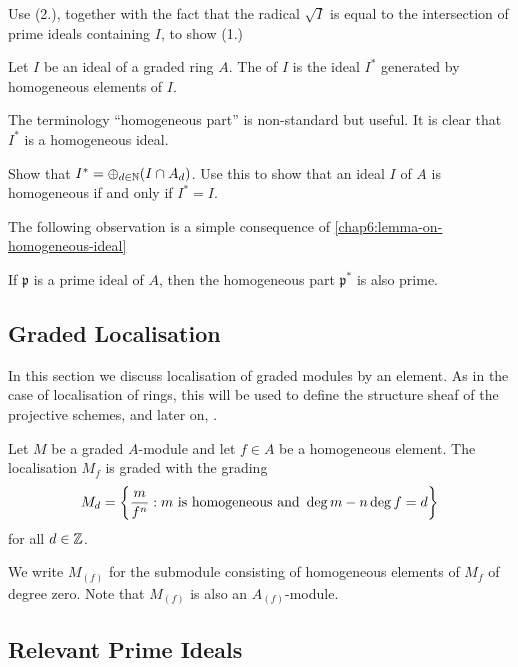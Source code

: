 \begin{exercise}
	Use (2.), together with the fact that the radical $\sqrt{I}$ is equal to the intersection of prime ideals containing $I$, to show (1.)
\end{exercise}

\begin{definition}
	Let $I$ be an ideal of a graded ring $A$. The  of $I$ is the ideal $I^\ast$ generated by homogeneous elements of $I$.
\end{definition}

The terminology ``homogeneous part'' is non-standard but useful. It is clear that $I^\ast$ is a homogeneous ideal.

\begin{exercise}
	Show that $I^\ast = \oplus_{d \in \NN} (I \cap A_d)$. Use this to show that an ideal $I$ of $A$ is homogeneous if and only if $I^\ast = I$.
\end{exercise}

The following observation is a simple consequence of \cref{chap6:lemma-on-homogeneous-ideal}
\begin{proposition}
If $\mathfrak{p}$ is a prime ideal of $A$, then the homogeneous part $\mathfrak{p}^\ast$ is also prime.
\end{proposition}


\subsection*{Graded Localisation}

In this section we discuss localisation of graded modules by an element. As in the case of localisation of rings, this will be used to define the structure sheaf of the projective schemes, and later on, .

\begin{lemma}
	Let $M$ be a graded $A$-module and let $f \in A$ be a homogeneous element. The localisation $M_f$ is graded with the grading
	\begin{equation*}
		M_d = \Set*{\frac{m}{f^n} : \text{$m$ is homogeneous and } \deg m - n\deg f = d}
	\end{equation*}
	for all $d \in \ZZ$.
\end{lemma}

We write $M_{(f)}$ for the submodule consisting of homogeneous elements of $M_f$ of degree zero. Note that $M_{(f)}$ is also an $A_{(f)}$-module.

\subsection*{Relevant Prime Ideals}

